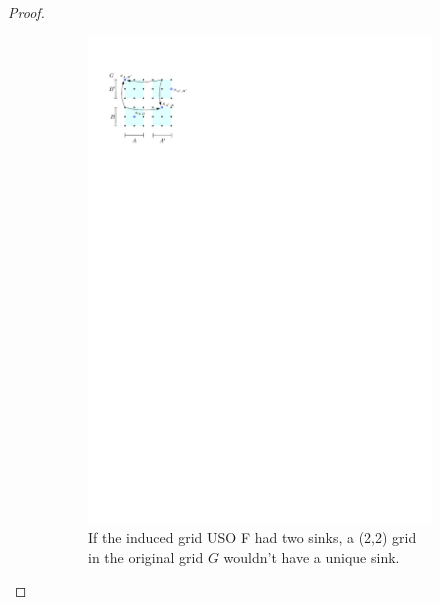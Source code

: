 \documentclass[runningheads,a4paper]{llncs}
\begin{document}
\begin{proof}
\begin{figure}
\begin{subfigure}[t]{0.45\textwidth}
\includegraphics{product_lemma_two_sinks.pdf}
\caption{\small If the induced grid USO F had two sinks, a (2,2) grid in the original grid $G$ wouldn't have a unique sink.}
\label{fig:InducedUSOtwosinks}
\end{subfigure}
\qquad\qquad
\begin{subfigure}[t]{0.44\textwidth}

\end{subfigure}
\end{figure}
\end{proof}
\end{document}

